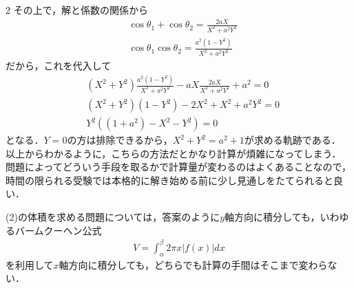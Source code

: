 \documentclass[../../main.tex]{subfiles}
\begin{document}
\begin{multicols}{2}
  その上で，解と係数の関係から
  \begin{align}
     & \cos\theta_1 + \cos\theta_2 = \frac{2aX}{X^2+a^2Y^2}                   \\
     & \cos\theta_1\cos\theta_2    = \frac{a^2\left(1-Y^2\right)}{X^2+a^2Y^2}
  \end{align}
  だから，これを代入して
  \begin{align*}
     & \left(X^2+Y^2\right)\frac{a^2\left(1-Y^2\right)}{X^2+a^2Y^2} -aX\frac{2aX}{X^2+a^2Y^2} + a^2 = 0 \\
     & \left(X^2+Y^2\right)\left(1-Y^2\right) -2X^2 + X^2+a^2Y^2 = 0                                    \\
     & Y^2\left((1+a^2) - X^2-Y^2\right) = 0
  \end{align*}
  となる．$Y=0$の方は排除できるから，$X^2+Y^2=a^2+1$が求める軌跡である．
  以上からわかるように，こちらの方法だとかなり計算が煩雑になってしまう．
  問題によってどういう手段を取るかで計算量が変わるのはよくあることなので，時間の限られる受験では本格的に解き始める前に少し見通しをたてられると良い．

  \vspace{10pt}
  (2)の体積を求める問題については，答案のように$y$軸方向に積分しても，いわゆるバームクーヘン公式
  \begin{align*}
    V = \int_{\alpha}^{\beta} 2\pi x |f(x)| dx
  \end{align*}
  を利用して$x$軸方向に積分しても，どちらでも計算の手間はそこまで変わらない．

  \begin{figure}[H]
    \centering
\end{figure}
\end{multicols}
\end{document}
